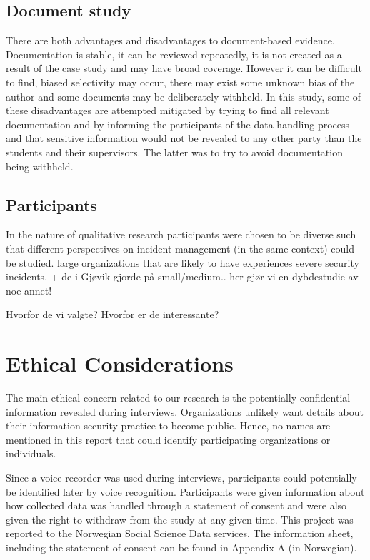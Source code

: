 \subsection{Document study}
\label{sec:documentStudy}
There are both advantages and disadvantages to document-based evidence. Documentation is stable, it can be reviewed repeatedly, it is not created as a result of the case study and may have broad coverage. However it can be difficult to find, biased selectivity may occur, there may exist some unknown bias of the author and some documents may be deliberately withheld. In this study, some of these disadvantages are attempted mitigated by trying to find all relevant documentation and by informing the participants of the data handling process and that sensitive information would not be revealed to any other party than the students and their supervisors. The latter was to try to avoid documentation being withheld.  


\subsection{Participants}
In the nature of qualitative research participants were chosen to be diverse such that different perspectives on incident management (in the same context) could be studied.
large organizations that are likely to have experiences severe security incidents. + de i Gjøvik gjorde på small/medium.. her gjør vi en dybdestudie av noe annet!

Hvorfor de vi valgte? Hvorfor er de interessante?

\section{Ethical Considerations}
The main ethical concern related to our research is the potentially confidential information revealed during interviews. Organizations unlikely want details about their information security practice to become public. Hence, no names are mentioned in this report that could identify participating organizations or individuals.

Since a voice recorder was used during interviews, participants could potentially be identified later by voice recognition. Participants were given information about how collected data was handled through a statement of consent and were also given the right to withdraw from the study at any given time. This project was reported to the Norwegian Social Science Data services. The information sheet, including the statement of consent can be found in Appendix A (in Norwegian).  

